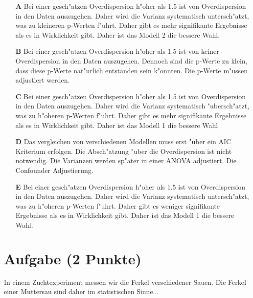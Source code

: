 \documentclass[a4paper, 10pt]{scrartcl}\usepackage[]{graphicx}\usepackage[]{xcolor}
\begin{document}
\begin{enumerate}
\item [\textbf{A} \msquare] Bei einer gesch{"a}tzen Overdispersion h{"o}her als 1.5 ist von Overdispersion in den Daten auszugehen. Daher wird die Varianz systematisch untersch{"a}tzt, was zu kleineren p-Werten f{"u}hrt. Daher gibt es mehr signifikante Ergebnisse als es in Wirklichkeit gibt. Daher ist das Modell 2 die bessere Wahl.
\item [\textbf{B} \msquare] Bei einer gesch{"a}tzen Overdispersion h{"o}her als 1.5 ist von keiner Overdispersion in den Daten auszugehen. Dennoch sind die p-Werte zu klein, dass diese p-Werte nat{"u}rlich entstanden sein k{"o}nnten. Die p-Werte m{"u}ssen adjustiert werden.
\item [\textbf{C} \msquare] Bei einer gesch{"a}tzen Overdispersion h{"o}her als 1.5 ist von Overdispersion in den Daten auszugehen. Daher wird die Varianz systematisch {"u}bersch{"a}tzt, was zu h{"o}heren p-Werten f{"u}hrt. Daher gibt es mehr signifikante Ergebnisse als es in Wirklichkeit gibt. Daher ist das Modell 1 die bessere Wahl
\item [\textbf{D} \msquare] Das vergleichen von verschiedenen Modellen muss erst {"u}ber ein AIC Kriterium erfolgen. Die Absch{"a}tzung {"u}ber die Overdispersion ist nicht notwendig. Die Varianzen werden sp{"a}ter in einer ANOVA adjustiert. Die Confounder Adjustierung.
\item [\textbf{E} \msquare] Bei einer gesch{"a}tzen Overdispersion h{"o}her als 1.5 ist von Overdispersion in den Daten auszugehen. Daher wird die Varianz systematisch untersch{"a}tzt, was zu h{"o}heren p-Werten f{"u}hrt. Daher gibt es weniger signifikante Ergebnisse als es in Wirklichkeit gibt. Daher ist das Modell 1 die bessere Wahl.
\end{enumerate}

\section{Aufgabe \hfill (2 Punkte)}

In einem Zuchtexperiment messen wir die Ferkel verschiedener Sauen. Die
Ferkel einer Muttersau sind daher im statistischen Sinne... 
\end{document}
